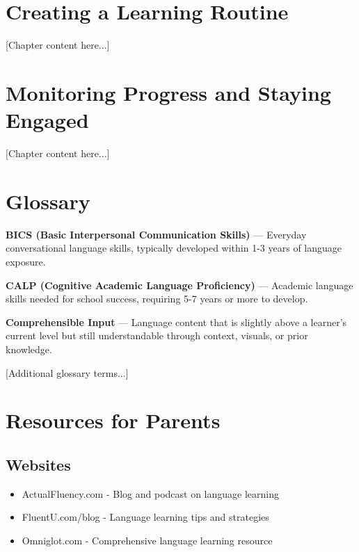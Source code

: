 \documentclass[11pt,oneside]{book}
\newcommand{\backmatter}{
  \cleardoublepage
}
\begin{document}
\chapter{Creating a Learning Routine}

[Chapter content here...]

\chapter{Monitoring Progress and Staying Engaged}

[Chapter content here...]


\backmatter

\chapter*{Glossary}

\textbf{BICS (Basic Interpersonal Communication Skills)} — Everyday conversational language skills, typically developed within 1-3 years of language exposure.

\textbf{CALP (Cognitive Academic Language Proficiency)} — Academic language skills needed for school success, requiring 5-7 years or more to develop.

\textbf{Comprehensible Input} — Language content that is slightly above a learner's current level but still understandable through context, visuals, or prior knowledge.

[Additional glossary terms...]

\chapter*{Resources for Parents}

\section*{Websites}
\begin{itemize}
\item ActualFluency.com - Blog and podcast on language learning
\item FluentU.com/blog - Language learning tips and strategies
\item Omniglot.com - Comprehensive language learning resource
\end{itemize}
\end{document}
